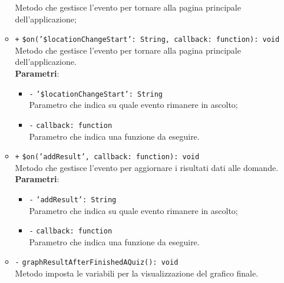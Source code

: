 \begin{itemize}
\begin{itemize}
			Metodo che gestisce l'evento per tornare alla pagina principale dell'applicazione;  
			\item \texttt{+} \texttt{\$on('\$locationChangeStart': String, callback: function): void} \\
			Metodo che gestisce l'evento per tornare alla pagina principale dell'applicazione.\\
			\textbf{Parametri}:
			\begin{itemize}
				\item \texttt{-} \texttt{'\$locationChangeStart': String} \\
				Parametro che indica su quale evento rimanere in ascolto;
				\item \texttt{-} \texttt{callback: function} \\
				Parametro che indica una funzione da eseguire.
			\end{itemize}
			\item \texttt{+} \texttt{\$on('addResult', callback: function): void} \\
			Metodo che gestisce l'evento per aggiornare i risultati dati alle domande. \\
			\textbf{Parametri}:
			\begin{itemize}
				\item \texttt{-} \texttt{'addResult': String} \\
				Parametro che indica su quale evento rimanere in ascolto;
				\item \texttt{-} \texttt{callback: function} \\
				Parametro che indica una funzione da eseguire.
			\end{itemize}
			\item \texttt{-} \texttt{graphResultAfterFinishedAQuiz(): void} \\
			Metodo imposta le variabili per la visualizzazione del grafico finale. 
		\end{itemize}
	\end{itemize}
	
	